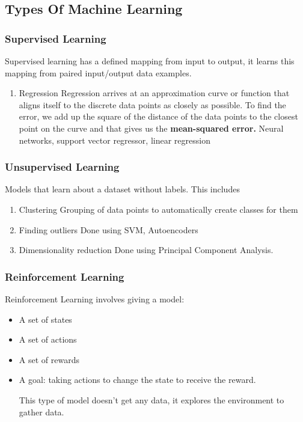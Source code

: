 \documentclass[11pt]{article}
\begin{document}
\subsection{Types Of Machine Learning}
\label{sec:org28bdf8f}
\subsubsection{Supervised Learning}
\label{sec:orgd9c3c61}
Supervised learning has a defined mapping from input to output, it learns this mapping from paired input/output data examples.
\begin{enumerate}
\item Regression
\label{sec:org16f10f3}
Regression arrives at an approximation curve or function that aligns itself to the discrete data points as closely as possible.
To find the error, we add up the square of the distance of the data points to the closest point on the curve and that gives us the \textbf{mean-squared error.}
Neural networks, support vector regressor, linear regression
\end{enumerate}
\subsubsection{Unsupervised Learning}
\label{sec:org789d802}
Models that learn about a dataset without labels.
This includes
\begin{enumerate}
\item Clustering
\label{sec:org277c40e}
Grouping of data points to automatically create classes for them
\item Finding outliers
\label{sec:orgfd49aa9}
Done using SVM, Autoencoders
\item Dimensionality reduction
\label{sec:org4bd5be5}
Done using Principal Component Analysis.
\end{enumerate}
\subsubsection{Reinforcement Learning}
\label{sec:orgc2565f8}
Reinforcement Learning involves giving a model:
\begin{itemize}
\item A set of states
\item A set of actions
\item A set of rewards
\item A goal: taking actions to change the state to receive the reward.

This type of model doesn't get any data, it explores the environment to gather data.
\end{itemize}
\end{document}
